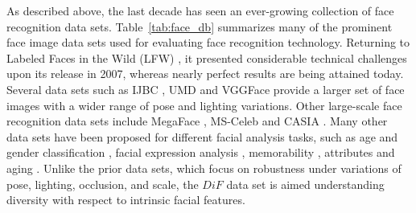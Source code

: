\documentclass[letterpaper,11pt]{article}
\begin{document}
As described above, the last decade has seen an ever-growing collection of face recognition data sets.  Table~\ref{tab:face_db} summarizes many of the prominent face image data sets used for evaluating face recognition technology. Returning to Labeled Faces in the Wild (LFW) \cite {LFW_Tech07}, it presented considerable technical challenges upon its release in 2007, whereas nearly perfect results are being attained today. Several data sets such as IJBC \cite{maze2018iarpa}, UMD \cite{UMDFaces_ARXIV16} and VGGFace \cite{VGG_BMVC15, VGG2_FG18} provide a larger set of face images with a wider range of pose and lighting variations. Other large-scale face recognition data sets include MegaFace \cite{Megaface_CVPR16}, MS-Celeb \cite{MSCELEB1M_ECCV16} and CASIA \cite{CASIA_ARXIV14}. Many other data sets have been proposed for different facial analysis tasks, such as age and gender classification \cite{CACD_TMM15, Levi_CVPRW15,Escalera_IJCNN17,imdbface_ECCV18, Adience_TIFS14,age14}, facial expression analysis \cite{Escalera_IJCNN17}, memorability \cite{Bainbridge_JEPG2013}, attributes \cite{Pubfig_PAMI11} and aging \cite{FGNET_IET_BIOMETRICS16}. Unlike the prior data sets, which focus on robustness under variations of pose, lighting, occlusion, and scale, the $DiF$ data set is aimed understanding diversity with respect to intrinsic facial features. 
\end{document}
